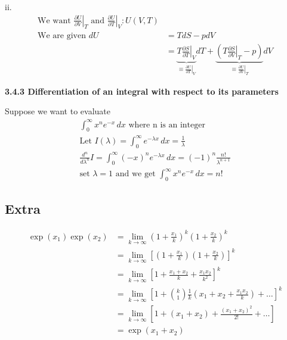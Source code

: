 ii. \begin{align*}
    \text{We want } \left. \frac{\partial U}{\partial V} \right|_{T} \text{ and } \left. \frac{\partial U}{\partial T} \right|_{V} : U(V, T) \\
    \text{We are given } dU &= TdS - pdV \\
    &= \underbrace{T \left. \frac{\partial S}{\partial T} \right|_{V}}_{\equiv \left. \frac{\partial U}{\partial T} \right|_{V}} dT + \underbrace{ \left( T \left. \frac{\partial S}{\partial V} \right|_{T} - p \right)}_{\equiv \left. \frac{\partial U}{\partial V} \right|_{T}} dV
\end{align*} 

\textbf{3.4.3 Differentiation of an integral with respect to its parameters}

\begin{example}
Suppose we want to evaluate
\begin{align*}
    \int_{0}^{\infty} x^n e^{-x} \,dx \text{ where n is an integer} \\
    \text{Let } I(\lambda) = \int_{0}^{\infty} e^{-\lambda x} \,dx = \frac{1}{\lambda} \\
    \frac{d^n}{d \lambda^n} I = \int_{0}^{\infty} (-x)^n e^{-\lambda x} \,dx = (-1)^n \frac{n!}{\lambda^{n + 1}} \\
    \text{set } \lambda = 1 \text{ and we get } \int_{0}^{\infty} x^n e^{-x} \,dx = n!
\end{align*}
\end{example}



\subsection{Extra}

\begin{align*}
    \exp \left(x_1 \right) \exp \left(x_2 \right) &= \lim_{k \to \infty} \left(1 + \frac{x_1}{k}\right)^k \left(1 + \frac{x_2}{k}\right)^k \\
    &= \lim_{k \to \infty} \left[ \left(1 + \frac{x_1}{k}\right)\left(1 + \frac{x_2}{k}\right) \right]^k \\
    &= \lim_{k \to \infty} \left[ 1 + \frac{x_1 + x_2}{k} + \frac{x_1 x_2}{k^2} \right]^k \\
    &= \lim_{k \to \infty} \left[ 1 + \binom{k}{1} \frac{1}{k} \left(x_1 + x_2 + \frac{x_1 x_2}{k} \right) + \ldots \right]^k \\
    &= \lim_{k \to \infty} \left[ 1 + \left( x_1 + x_2 \right) + \frac{\left( x_1 + x_2 \right)^2}{2!} + \ldots \right] \\
    &= \exp \left( x_1 + x_2 \right)
\end{align*}


